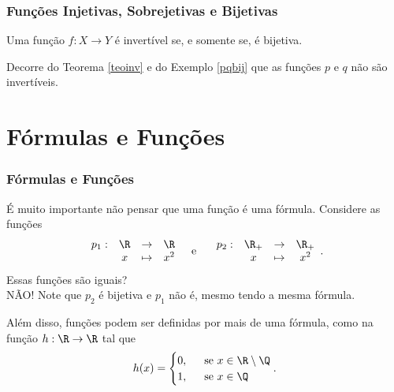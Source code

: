 \documentclass[brazil, notheorems, 10pt]{beamer}
\begin{document}
\begin{frame}
\frametitle{Funções Injetivas, Sobrejetivas e Bijetivas} %

\begin{teorema}\label{teoinv}
Uma função $f: X \to Y$ é invertível se, e somente se, é bijetiva.
\end{teorema}\pause

\begin{exemplo}
Decorre do Teorema \ref{teoinv} e do Exemplo \ref{pqbij} que as
funções $p$ e $q$ não são invertíveis.
\end{exemplo}

\end{frame}



\section{Fórmulas e Funções}
\begin{frame}
\frametitle{Fórmulas e Funções} %
É muito importante não pensar que uma função é uma fórmula.
Considere as funções
$$\begin{array}{cccc}
p_1 : & \R & \to     & \R \\
		 &  x & \mapsto & x^2
\end{array}
\text{\ \ \  e \ \ \ }
\begin{array}{cccc}
p_2 : & \R_+ & \to     & \R_+ \\
		 &  x & \mapsto &  x^2
\end{array}.$$
Essas funções são iguais? \\ \pause NÃO! Note que $p_2$ é bijetiva e
$p_1$ não é, mesmo tendo a mesma fórmula.

Além disso, funções podem ser definidas por mais de uma fórmula,
como na função $h :  \R  \to      \R$ tal que
		 $$h(x) =  \begin{cases}
						0, &  \ \text{ se } x \in \R \setminus \Q \\
						1, & \ \text{ se } x \in \Q
						\end{cases} .$$
\end{frame}



\end{document}
